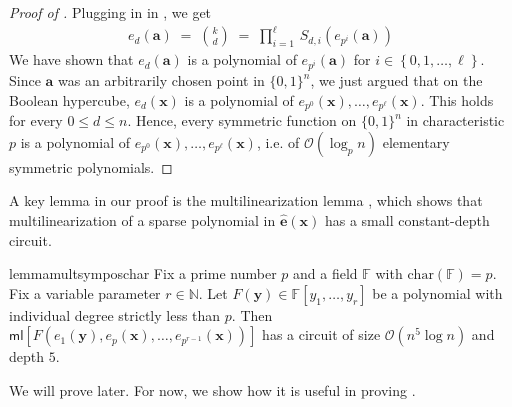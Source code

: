 \documentclass[11pt]{article}
\newcommand{\Boo}{\{0,1 \}}
\newcommand{\bigO}{\mathcal{O}}
\newcommand{\set}[1]{\left\{ #1 \right\}}
\newcommand{\F}{\mathbb{F}}
\newcommand{\ml}{\mathsf{ml}}
\begin{document}
\begin{proof}[Proof of ]
Plugging in  in , we get
\begin{align*}
    e_{d}(\mathbf{a}) \; = \; \binom{k}{d} \; = \; \prod_{i = 1}^{\ell} \, S_{d,i}(e_{p^{i}}(\mathbf{a}))
\end{align*}
We have shown that $e_{d}(\mathbf{a})$ is a polynomial of $e_{p^{i}}(\mathbf{a})$ for $i \in \set{0,1,\ldots,\ell}$. Since $\mathbf{a}$ was an arbitrarily chosen point in $\Boo^{n}$, we just argued that on the Boolean hypercube, $e_{d}(\mathbf{x})$ is a polynomial of $e_{p^{0}}(\mathbf{x}),\ldots,e_{p^{\ell}}(\mathbf{x})$. This holds for every $0 \leq d \leq n$. Hence, every symmetric function on $\Boo^{n}$ in characteristic $p$ is a polynomial of $e_{p^{0}}(\mathbf{x}),\ldots,e_{p^{\ell}}(\mathbf{x})$, i.e. of $\bigO(\log_{p} n)$ elementary symmetric polynomials.
\end{proof}


A key lemma in our proof is the multilinearization lemma , which shows that multilinearization of a sparse polynomial in $\widehat{\mathbf{e}}(\mathbf{x})$ has a small constant-depth circuit.\\

\begin{restatable}{lemma}{multsymposchar}\label{lemma:multilinearize-char-p}
Fix a prime number $p$ and a field $\F$ with $\mathrm{char}(\F) = p$. Fix a variable parameter $r \in \mathbb{N}$.\newline
Let $F(\mathbf{y}) \in \F[y_{1},\ldots,y_{r}]$ be a polynomial with individual degree strictly less than $p$. Then \break $\ml[F(e_{1}(\mathbf{y}), e_{p}(\mathbf{x}), \ldots, e_{p^{r-1}}(\mathbf{x}))]$ has a circuit of size $\bigO( n^{5} \log n)$ and depth $5$.    
\end{restatable}

\noindent
We will prove  later. For now, we show how it is useful in proving .
\end{document}
